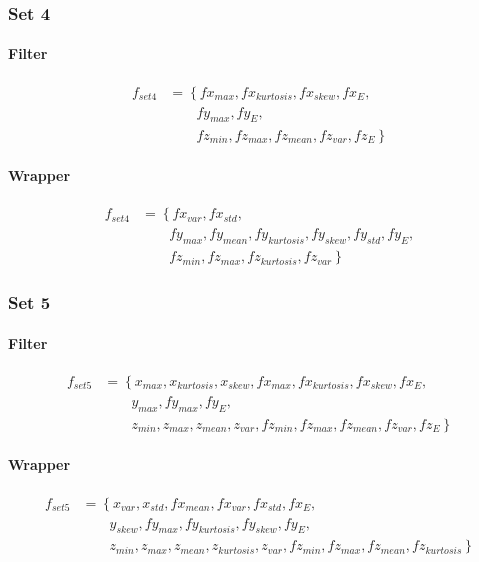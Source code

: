 \documentclass[USenglish]{ifimaster}  %
\begin{document}
\subsubsection{Set 4}
\paragraph{Filter}
\begin{align}
f_{set4} &= \left\{fx_{max}, fx_{kurtosis}, fx_{skew}, fx_{E}, \right.\nonumber\\
&\qquad \left.{} fy_{max}, fy_{E}, \right.\nonumber\\
&\qquad \left.{} fz_{min}, fz_{max}, fz_{mean}, fz_{var}, fz_{E} \right\}
\end{align}

\paragraph{Wrapper}
\begin{align}
f_{set4} &= \left\{fx_{var}, fx_{std}, \right.\nonumber\\
&\qquad \left.{} fy_{max}, fy_{mean}, fy_{kurtosis}, fy_{skew}, fy_{std}, fy_{E}, \right.\nonumber\\
&\qquad \left.{} fz_{min}, fz_{max}, fz_{kurtosis}, fz_{var} \right\}
\end{align}

\subsubsection{Set 5}
\paragraph{Filter}
\begin{align}
f_{set5} &= \left\{x_{max}, x_{kurtosis}, x_{skew}, fx_{max}, fx_{kurtosis}, fx_{skew}, fx_{E}, \right.\nonumber\\
&\qquad \left.{} y_{max}, fy_{max}, fy_{E}, \right.\nonumber\\
&\qquad \left.{} z_{min}, z_{max}, z_{mean}, z_{var}, fz_{min}, fz_{max}, fz_{mean}, fz_{var}, fz_{E} \right\}
\end{align}

\paragraph{Wrapper}
\begin{align}
f_{set5} &= \left\{x_{var}, x_{std}, fx_{mean}, fx_{var}, fx_{std}, fx_{E}, \right.\nonumber\\
&\qquad \left.{} y_{skew}, fy_{max}, fy_{kurtosis}, fy_{skew}, fy_{E}, \right.\nonumber\\
&\qquad \left.{} z_{min}, z_{max}, z_{mean}, z_{kurtosis}, z_{var}, fz_{min}, fz_{max}, fz_{mean}, fz_{kurtosis} \right\}
\end{align}
%
\end{document}
